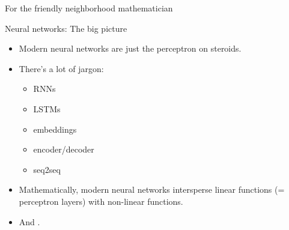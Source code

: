 \documentclass[xcolor={usenames,svgnames,x11names,dvipsnames,table}]{beamer}
\begin{document}
\begin{frame}{For the friendly neighborhood mathematician}
\end{frame}

\begin{frame}{Neural networks: The big picture}
    \begin{itemize}
        \item Modern neural networks are just the perceptron on steroids.
        \item There's a lot of jargon:
            \begin{itemize}
                \item RNNs
                \item LSTMs
                \item embeddings
                \item encoder/decoder
                \item seq2seq
            \end{itemize}
        \item Mathematically, modern neural networks intersperse linear functions (= perceptron layers) with non-linear functions.
        \item And .\\
    \end{itemize}
\end{frame}
\end{document}
